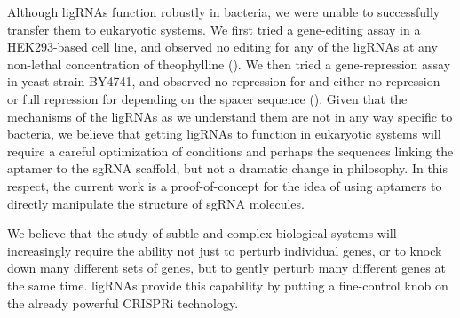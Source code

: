 \documentclass[10pt,oneside]{article}
\begin{document}
Although ligRNAs function robustly in bacteria, we were unable to successfully transfer them to eukaryotic systems.  We first tried a gene-editing assay in a HEK293-based cell line, and observed no editing for any of the ligRNAs at any non-lethal concentration of theophylline ().  We then tried a gene-repression assay in yeast strain BY4741, and observed no repression for \ligrnaF{} and either no repression or full repression for \ligrnaB{} depending on the spacer sequence ().  Given that the mechanisms of the ligRNAs as we understand them are not in any way specific to bacteria, we believe that getting ligRNAs to function in eukaryotic systems will require a careful optimization of conditions and perhaps the sequences linking the aptamer to the sgRNA scaffold, but not a dramatic change in philosophy.  In this respect, the current work is a proof-of-concept for the idea of using aptamers to directly manipulate the structure of sgRNA molecules.
% 
% 



We believe that the study of subtle and complex biological systems will increasingly require the ability not just to perturb individual genes, or to knock down many different sets of genes, but to gently perturb many different genes at the same time.  ligRNAs provide this capability by putting a fine-control knob on the already powerful CRISPRi technology.
\end{document}
